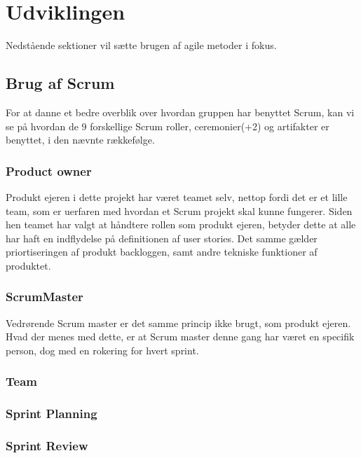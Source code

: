 \chapter{Udviklingen}\label{ch:Udviklingen}

Nedstående sektioner vil sætte brugen af agile metoder i fokus. 

\section{Brug af Scrum}

For at danne et bedre overblik over hvordan gruppen har benyttet Scrum, kan vi se på hvordan de 9 forskellige Scrum roller, ceremonier(+2) og artifakter er benyttet, i den nævnte rækkefølge.

\subsection{Product owner}

Produkt ejeren i dette projekt har været teamet selv, nettop fordi det er et lille team, som er uerfaren med hvordan et Scrum projekt skal kunne fungerer. Siden hen teamet har valgt at håndtere rollen som produkt ejeren, betyder dette at alle har haft en indflydelse på definitionen af user stories. Det samme gælder priortiseringen af produkt backloggen, samt andre tekniske funktioner af produktet. 

\subsection{ScrumMaster}

Vedrørende Scrum master er det samme princip ikke brugt, som produkt ejeren. Hvad der menes med dette, er at Scrum master denne gang har været en specifik person, dog med en rokering for hvert sprint. 

\subsection{Team}


\subsection{Sprint Planning}


\subsection{Sprint Review}


